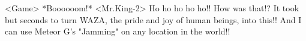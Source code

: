 <Game> *Boooooom!* 
<Mr.King-2> Ho ho ho ho ho!! 
How was that!? 
It took but seconds to turn WAZA, the pride and joy of human beings, into this!! 
And I can use Meteor G's "Jamming" on any location in the world!! 
